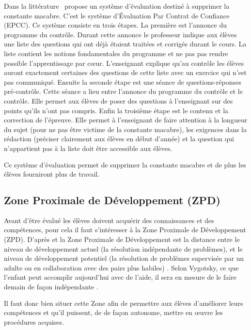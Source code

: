 Dans la littérature~\cite{antibi2007notes} propose un système d'évaluation destiné à supprimer la constante macabre.
C'est le système d'Évaluation Par Contrat de Confiance (EPCC).
Ce système consiste en trois étapes. La première est l'annonce du programme du contrôle.
Durant cette annonce le professeur indique aux élèves une liste des questions qui ont déjà étaient traitées et corrigés durant le cours.
La liste contient les notions fondamentales du programme et ne pas pas rendre possible l'apprentissage par cœur.
L'enseignant explique qu'au contrôle les élèves auront exactement certaines des questions de cette liste avec un exercice qui n'est pas communiqué.
Ensuite la seconde étape est une séance de questions-réponses pré-contrôle.
Cette séance a lieu entre l'annonce du programme du contrôle et le contrôle.
Elle permet aux élèves de poser des questions à l'enseignant sur des points qu'ils n'ont pas compris.
Enfin la troisième étape est le contenu et la correction de l'épreuve.
Elle permet à l'enseignant de faire attention à la longueur du sujet (pour ne pas être victime de la constante macabre), les exigences dans la rédaction (préciser clairement aux élèves en début d'année) et la question qui n'appartient pas à la liste doit être accessible aux élèves.

Ce système d'évaluation permet de supprimer la constante macabre et de plus les élèves fourniront plus de travail.


\subsection{Zone Proximale de Développement (ZPD)}

Avant d'être évalué les élèves doivent acquérir des connaissances et des compétences, pour cela il faut s'intéresser à la Zone Proximale de Développement (ZPD).
D'après \cite{vygotsky1978interaction} et \cite{bodrova2011outils} la Zone Proximale de Développement est \og la distance entre le niveau de développement actuel (la résolution indépendante de problèmes), et le niveau de développement potentiel (la résolution de problèmes supervisée par un adulte ou en collaboration avec des pairs plus habiles) \fg.
 \og Selon Vygotsky, ce que l'enfant peut accomplir aujourd'hui avec de l'aide, il sera en mesure de le faire demain de façon indépendante \fg{} \cite{vygotsky1987zone} \cite{bodrova2011outils}.

Il faut donc bien situer cette Zone afin de permettre aux élèves d'améliorer leurs compétences et qu'il puissent, de  de façon autonome, mettre en œuvre les procédures acquises.






